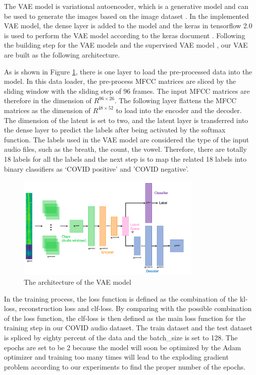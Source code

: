 \documentclass[11pt]{article}
\begin{document}
The VAE model is variational autoencoder, which is a generative model and can be used to generate the images based on the image dataset \cite{doersch2016tutorial}. In the implemented VAE model, the dense layer is added to the model \cite{ji2020multi} and the keras in tensorflow 2.0 is used to perform the VAE model according to the keras document \cite{kerasVAE}. Following the building step for the VAE models \cite{mediumVAE} and the supervised VAE model \cite{linkedinVAE}, our VAE are built as the following architecture.

As is shown in Figure \ref{fig:vae_diagram}, there is one layer to load the pre-processed data into the model. In this data loader, the pre-process MFCC matrices are sliced by the sliding window with the sliding step of 96 frames. The input MFCC matrices are therefore in the dimension of $R^{96\times26}$. The following layer flattens the MFCC matrices as the dimension of $R^{48\times52}$ to load into the encoder and the decoder. The dimension of the latent is set to two, and the latent layer is transferred into the dense layer to predict the labels after being activated by the softmax function. The labels used in the VAE model are considered the type of the input audio files, such as the breath, the count, the vowel. Therefore, there are totally 18 labels for all the labels and the next step is to map the related 18 labels into binary classifiers as ‘COVID positive’ and ’COVID negative’.

\begin{figure}[htbp]{}
	\centering
    \includegraphics[width=0.8\textwidth]{./imgs/vaeDiagram.png} %
    \caption{The architecture of the VAE model}
    \label{fig:vae_diagram}
\end{figure}

In the training process, the loss function is defined as the combination of the kl-loss, reconstruction loss and clf-loss. By comparing with the possible combination of the loss function, the clf-loss is then defined as the main loss function for the training step in our COVID audio dataset. The train dataset and the test dataset is spliced by eighty percent of the data and the batch\_size is set to 128. The epochs are set to be 2 because the model will soon be optimized by the Adam optimizer and training too many times will lead to the exploding gradient problem according to our experiments to find the proper number of the epochs.
 
\end{document}
